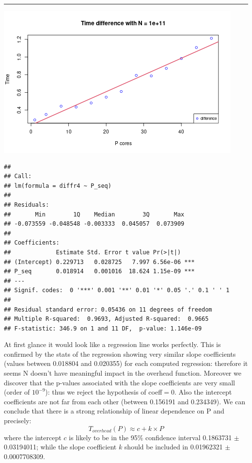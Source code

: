 \documentclass[
  10pt,
]{article}
\begin{document}
\begin{center}\rule{0.5\linewidth}{0.5pt}\end{center}

\begin{center}\includegraphics{figs/ws_overhead-4} \end{center}

\begin{verbatim}
## 
## Call:
## lm(formula = diffr4 ~ P_seq)
## 
## Residuals:
##       Min        1Q    Median        3Q       Max 
## -0.073559 -0.048548 -0.003333  0.045057  0.073909 
## 
## Coefficients:
##             Estimate Std. Error t value Pr(>|t|)    
## (Intercept) 0.229713   0.028725   7.997 6.56e-06 ***
## P_seq       0.018914   0.001016  18.624 1.15e-09 ***
## ---
## Signif. codes:  0 '***' 0.001 '**' 0.01 '*' 0.05 '.' 0.1 ' ' 1
## 
## Residual standard error: 0.05436 on 11 degrees of freedom
## Multiple R-squared:  0.9693, Adjusted R-squared:  0.9665 
## F-statistic: 346.9 on 1 and 11 DF,  p-value: 1.146e-09
\end{verbatim}

At first glance it would look like a regression line works perfectly.
This is confirmed by the stats of the regression showing very similar
slope coefficients (values between 0.018804 and 0.020355) for each
computed regression: therefore it seems N doesn't have meaningful impact
in the overhead function. Moreover we discover that the p-values
associated with the slope coefficients are very small (order of
\(10^{-9}\)): thus we reject the hypothesis of coeff\(=0\). Also the
intercept coefficients are not far from each other (between 0.156191 and
0.234349). We can conclude that there is a strong relationship of linear
dependence on P and precisely: \[T_{overhead}(P)\approx c + k\times P\]
where the intercept \(c\) is likely to be in the 95\% confidence
interval 0.1863731 \(\pm\) 0.03194011; while the slope coefficient \(k\)
should be included in 0.01962321 \(\pm\) 0.0007708309.
\end{document}
